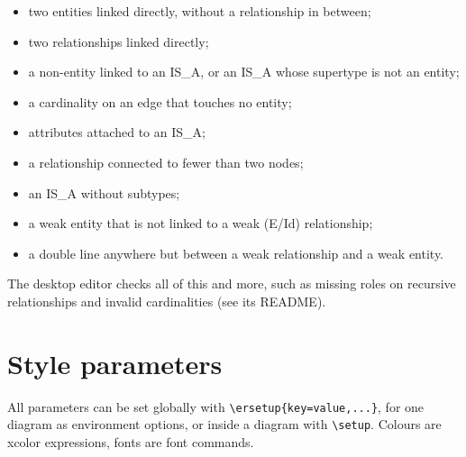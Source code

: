 \documentclass[10pt,a4paper]{article}
\newcommand\cs[1]{\texttt{\textbackslash#1}}
\begin{document}
\begin{itemize}
\item two entities linked directly, without a relationship in between;
\item two relationships linked directly;
\item a non-entity linked to an IS\_A, or an IS\_A whose supertype
  is not an entity;
\item a cardinality on an edge that touches no entity;
\item attributes attached to an IS\_A;
\item a relationship connected to fewer than two nodes;
\item an IS\_A without subtypes;
\item a weak entity that is not linked to a weak (E/Id) relationship;
\item a double line anywhere but between a weak relationship and a weak entity.
\end{itemize}

The desktop editor checks all of this and more, such as missing roles on recursive relationships
and invalid cardinalities (see its README).

\section{Style parameters}\label{sec:style}

All parameters can be set globally with \cs{ersetup}\verb|{key=value,...}|,
for one diagram as environment options, or inside a diagram with
\cs{setup}. Colours are xcolor expressions, fonts are font commands.
\end{document}
